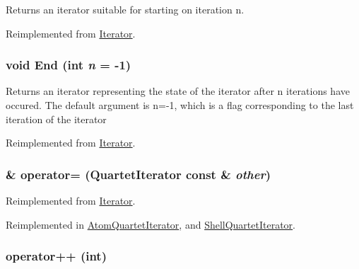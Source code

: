 Returns an iterator suitable for starting on iteration n. 

Reimplemented from \hyperlink{classJKBuilder_1_1Iterator_a34ca36a99b20ae3170babadaffe51ed2}{Iterator}.\hypertarget{classJKBuilder_1_1QuartetIterator_a5f692b73d2e160450f4617bb75825e11}{
\subsubsection[{End}]{\setlength{\rightskip}{0pt plus 5cm}void End (int {\em n} = {\ttfamily -\/1})}}
\label{classJKBuilder_1_1QuartetIterator_a5f692b73d2e160450f4617bb75825e11}


Returns an iterator representing the state of the iterator after n iterations have occured. The default argument is n=-\/1, which is a flag corresponding to the last iteration of the iterator 

Reimplemented from \hyperlink{classJKBuilder_1_1Iterator_a5f692b73d2e160450f4617bb75825e11}{Iterator}.\hypertarget{classJKBuilder_1_1QuartetIterator_ab3cd17222545586596dbbc6aa3ca7046}{
\subsubsection[{operator=}]{ \& operator= ({\bf QuartetIterator} const \& {\em other})}}
\label{classJKBuilder_1_1QuartetIterator_ab3cd17222545586596dbbc6aa3ca7046}


Reimplemented from \hyperlink{classJKBuilder_1_1Iterator_ae6f4f24e1855d2aaf89a8a60a9f1521b}{Iterator}.

Reimplemented in \hyperlink{classJKBuilder_1_1AtomQuartetIterator_a39f50a07009d2e9e81e1d64da594084f}{AtomQuartetIterator}, and \hyperlink{classJKBuilder_1_1ShellQuartetIterator_acd8ac6ed2e831bcb87e65acc0de747db}{ShellQuartetIterator}.\hypertarget{classJKBuilder_1_1Iterator_ac1702aedba13b4112b891b58dfd78eba}{
\subsubsection[{operator++}]{ operator++ (int)}}
\label{classJKBuilder_1_1Iterator_ac1702aedba13b4112b891b58dfd78eba}


